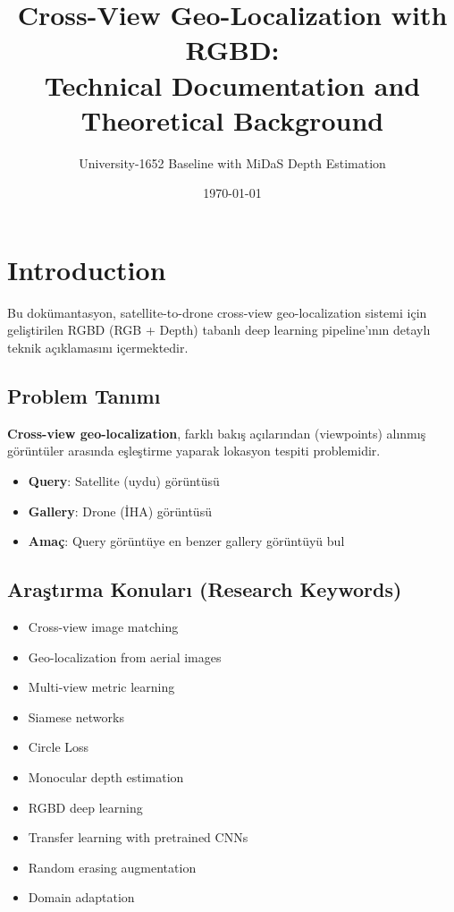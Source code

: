 \documentclass[12pt,a4paper]{article}
\title{\textbf{Cross-View Geo-Localization with RGBD:\\Technical Documentation and Theoretical Background}}
\author{University-1652 Baseline with MiDaS Depth Estimation}
\date{\today}
\begin{document}
\maketitle
\tableofcontents
\newpage

\section{Introduction}

Bu dokümantasyon, satellite-to-drone cross-view geo-localization sistemi için geliştirilen RGBD (RGB + Depth) tabanlı deep learning pipeline'ının detaylı teknik açıklamasını içermektedir.

\subsection{Problem Tanımı}
\textbf{Cross-view geo-localization}, farklı bakış açılarından (viewpoints) alınmış görüntüler arasında eşleştirme yaparak lokasyon tespiti problemidir.

\begin{itemize}
    \item \textbf{Query}: Satellite (uydu) görüntüsü
    \item \textbf{Gallery}: Drone (İHA) görüntüsü
    \item \textbf{Amaç}: Query görüntüye en benzer gallery görüntüyü bul
\end{itemize}

\subsection{Araştırma Konuları (Research Keywords)}
\begin{itemize}
    \item Cross-view image matching
    \item Geo-localization from aerial images
    \item Multi-view metric learning
    \item Siamese networks
    \item Circle Loss
    \item Monocular depth estimation
    \item RGBD deep learning
    \item Transfer learning with pretrained CNNs
    \item Random erasing augmentation
    \item Domain adaptation
\end{itemize}
\end{document}
